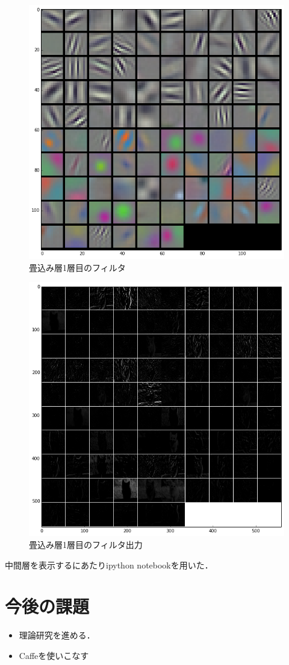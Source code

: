 \documentclass[a4paper,10pt]{jsarticle}
\begin{document}
\begin{figure}[t]
 \centering
 \includegraphics[scale=0.5]{fig/png/conv1_params.png}
  \caption{畳込み層1層目のフィルタ}
  \label{220453_1Jul15}
\end{figure}
\begin{figure}[t]
 \centering
 \includegraphics[scale=0.5]{fig/png/conv1_blobs.png}
  \caption{畳込み層1層目のフィルタ出力}
  \label{220458_1Jul15}
\end{figure}

中間層を表示するにあたりipython notebookを用いた．
\section{今後の課題}
\begin{itemize}
 \item 理論研究を進める．
 \item Caffeを使いこなす
\end{itemize}
\end{document}
